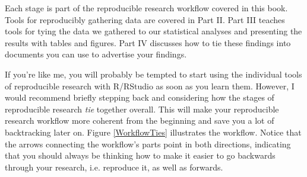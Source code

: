 Each stage is part of the reproducible research workflow covered in this book. Tools for reproducibly gathering data are covered in Part II. Part III teaches tools for tying the data we gathered to our statistical analyses and presenting the results with tables and figures. Part IV discusses how to tie these findings into documents you can use to advertise your findings.

If you're like me, you will probably be tempted to start using the individual tools of reproducible research with R/RStudio as soon as you learn them. However, I would recommend briefly stepping back and considering how the stages of reproducible research {\emph{tie}} together overall. This will make your reproducible research workflow more coherent from the beginning and save you a lot of backtracking later on.  Figure \ref{WorkflowTies} illustrates the workflow. Notice that the arrows connecting the workflow's parts point in both directions, indicating that you should always be thinking how to make it easier to go backwards through your research, i.e. reproduce it, as well as forwards. 

